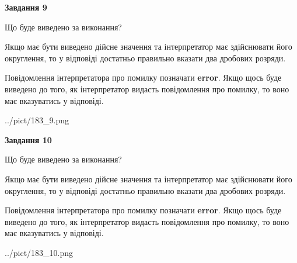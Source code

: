 \documentclass[12pt, ukrainian]{article}
\begin{document}
{\begin {Large}
{\begin {center}\textbf{Завдання 9}\end {center}}\par
Що буде виведено за виконання? \par

Якщо має бути виведено дійсне значення та інтерпретатор має здійснювати його округлення, 
то у відповіді достатньо правильно вказати два дробових розряди.

Повідомлення інтерпретатора про помилку позначати \textbf{error}.
Якщо щось буде виведено до того, як інтерпретатор видасть повідомлення про помилку, 
то воно має вказуватись у відповіді. \par

\begin{center}
	{../pict/183_9.png}
\end{center}
\newpage

{\begin {center}\textbf{Завдання 10}\end {center}}\par
Що буде виведено за виконання? \par

Якщо має бути виведено дійсне значення та інтерпретатор має здійснювати його округлення, 
то у відповіді достатньо правильно вказати два дробових розряди.

Повідомлення інтерпретатора про помилку позначати \textbf{error}.
Якщо щось буде виведено до того, як інтерпретатор видасть повідомлення про помилку, 
то воно має вказуватись у відповіді. \par

\begin{center}
	{../pict/183_10.png}
\end{center}
\newpage

\end {Large}}
\end{document}
